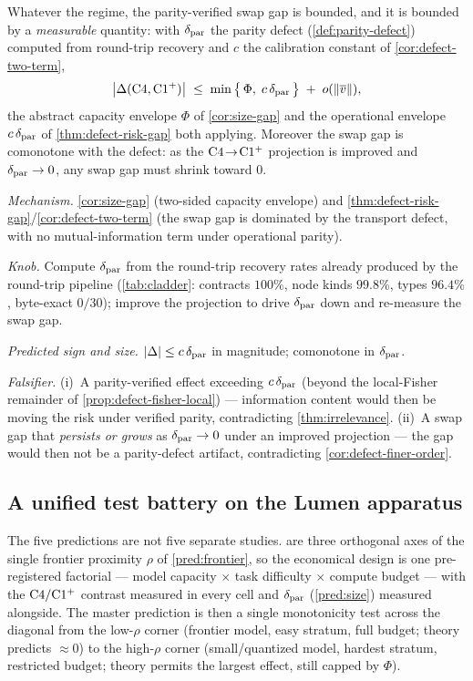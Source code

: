 \begin{prediction}
\label{pred:size}
Whatever the regime, the parity-verified swap gap is bounded, and it is bounded
by a \emph{measurable} quantity: with $\delta_{\mathrm{par}}$ the parity defect
(\cref{def:parity-defect}) computed from round-trip recovery and $c$ the
calibration constant of \cref{cor:defect-two-term},
\[
  \big|\Delta(\mathrm{C}4,\mathrm{C1^{+}})\big|
  \;\le\; \min\big\{\,\Phi,\; c\,\delta_{\mathrm{par}}\,\big\} \;+\; o(\|\overline v\|),
\]
the abstract capacity envelope $\Phi$ of \cref{cor:size-gap} and the operational
envelope $c\,\delta_{\mathrm{par}}$ of \cref{thm:defect-risk-gap} both applying.
Moreover the swap gap is comonotone with the defect: as the $\mathrm{C}4\!\to\!
\mathrm{C1^{+}}$ projection is improved and $\delta_{\mathrm{par}}\to 0$, any swap gap must
shrink toward $0$.\par
\emph{Mechanism.} \cref{cor:size-gap} (two-sided capacity envelope) and
\cref{thm:defect-risk-gap}/\cref{cor:defect-two-term} (the swap gap is dominated
by the transport defect, with no mutual-information term under operational
parity).\par
\emph{Knob.} Compute $\delta_{\mathrm{par}}$ from the round-trip recovery rates already
produced by the round-trip pipeline (\cref{tab:cladder}: contracts $100\%$, node kinds
$99.8\%$, types $96.4\%$, byte-exact $0/30$); improve the projection to drive
$\delta_{\mathrm{par}}$ down and re-measure the swap gap.\par
\emph{Predicted sign and size.} $|\Delta|\le c\,\delta_{\mathrm{par}}$ in magnitude;
comonotone in $\delta_{\mathrm{par}}$.\par
\emph{Falsifier.} (i)~A parity-verified effect exceeding $c\,\delta_{\mathrm{par}}$
(beyond the local-Fisher remainder of \cref{prop:defect-fisher-local}) ---
information content would then be moving the risk under verified parity,
contradicting \cref{thm:irrelevance}. (ii)~A swap gap that \emph{persists or
grows} as $\delta_{\mathrm{par}}\to 0$ under an improved projection --- the gap would
then not be a parity-defect artifact, contradicting \cref{cor:defect-finer-order}.
\end{prediction}

\subsection{A unified test battery on the Lumen apparatus}
\label{subsec:battery}

The five predictions are not five separate studies.  are three orthogonal axes of the single frontier
proximity $\rho$ of \cref{pred:frontier}, so the economical design is one
pre-registered factorial --- model capacity $\times$ task difficulty $\times$
compute budget --- with the $\mathrm{C}4/\mathrm{C1^{+}}$ contrast measured in every
cell and $\delta_{\mathrm{par}}$ (\cref{pred:size}) measured alongside. The master
prediction is then a single monotonicity test across the diagonal from the
low-$\rho$ corner (frontier model, easy stratum, full budget; theory predicts
$\approx 0$) to the high-$\rho$ corner (small/quantized model, hardest stratum,
restricted budget; theory permits the largest effect, still capped by $\Phi$).

